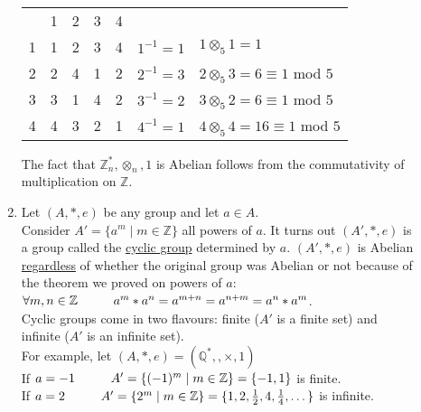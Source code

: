 \documentclass[10pt]{article}
\begin{document}
\begin{description}
\begin{enumerate}
			\begin{center}
				\begin{tabular}[h!]{|c|cccc|rl}
					\cline{1-5}
					& 1 & 2 & 3 & 4\\ \cline{1-5}
					1 & 1 & 2 & 3 & 4 & \hspace{10mm} $1^{-1} = 1$ & $1 \otimes_5 1 = 1$ \\
					2 & 2 & 4 & 1 & 2 & \hspace{10mm} $2^{-1} = 3$ & $2 \otimes_5 3 = 6 \equiv 1$ mod $5$ \\
					3 & 3 & 1 & 4 & 2 & \hspace{10mm} $3^{-1} = 2$ & $3 \otimes_5 2 = 6 \equiv 1$ mod $5$ \\
					4 & 4 & 3 & 2 & 1 & \hspace{10mm} $4^{-1} = 1$ & $4 \otimes_5 4 = 16 \equiv 1$ mod $5$ \\
					\cline{1-5}
				\end{tabular}
			\end{center}
			The fact that $\mathbb{Z}^*_n, \otimes _n, 1$ is Abelian follows from the commutativity of multiplication on $\mathbb{Z}$.
			\item Let $(A, *, e)$ be any group and let $a \in A$. \\
			Consider $A' = \{a^m \mid m \in \mathbb{Z}\}$ all powers of $a$. It turns out $(A', *, e)$ is a group called the \underline{cyclic group} determined by $a$. $(A', *, e)$ is Abelian \underline{regardless} of whether the original group was Abelian or not because of the theorem we proved on powers of $a$: $\forall m, n \in \mathbb{Z} \hspace{10mm} a^m * a^n = a^{m+n} = a^{n+m} = a^n * a^m$. \\
			Cyclic groups come in two flavours: finite ($A'$ is a finite set) and infinite ($A'$ is an infinite set). \\
			For example, let $(A, *, e) = (\mathbb{Q}^*, , \times , 1)$ \\
			If $a=-1 \hspace{10mm} A' = \{(-1)^m \mid m \in \mathbb{Z}\} = \{-1, 1\}$ is finite. \\
			If $a=2 \hspace{10mm} A' = \{2^m \mid m \in \mathbb{Z}\} = \{1, 2, \frac{1}{2}, 4, \frac{1}{4}, \dots\}$ is infinite.
		\end{enumerate}
	\end{description}
	
\end{document}
